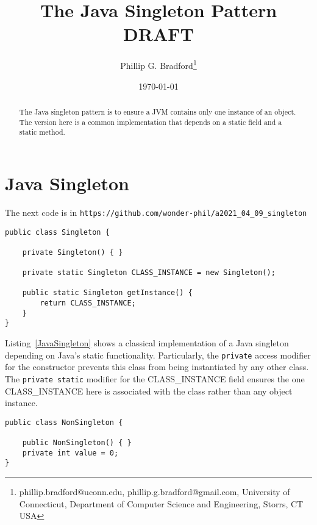 \documentclass[12pt]{article}
\begin{document}
\title{{\bf The Java Singleton Pattern\\DRAFT}}
\author{
Phillip G. Bradford\thanks{phillip.bradford@uconn.edu, phillip.g.bradford@gmail.com,
{\sc University of Connecticut, Department of Computer Science and Engineering, Storrs, CT USA}}
}

\date{\small\today}

\maketitle

%
%
%
\begin{abstract}
The Java singleton pattern is to ensure a JVM contains only one instance of an object.
The version here is a common implementation that depends on a static field and a static method.
\end{abstract}

%
%
%
%
\section{Java Singleton}
\label{Java Singleton}
%
%
%

The next code is in \lstinline|https://github.com/wonder-phil/a2021_04_09_singleton|


\begin{lstlisting}[label=JavaSingleton,frame=lines,caption=Basic Singleton]
public class Singleton {
	
	private Singleton() { }
	
	private static Singleton CLASS_INSTANCE = new Singleton();

	public static Singleton getInstance() {
		return CLASS_INSTANCE;
	}
}
\end{lstlisting}

Listing~\ref{JavaSingleton} shows a classical implementation of a Java singleton depending on Java's static functionality.
Particularly, the \lstinline|private| access modifier for the constructor prevents this class from being instantiated by any other
class.
The \lstinline|private static| modifier for the CLASS\_INSTANCE field ensures the one CLASS\_INSTANCE here is associated with the class
rather than any object instance.

\begin{lstlisting}[label=JavaNONSingleton,frame=lines,caption=Basic Non-Singleton]
public class NonSingleton {
	
	public NonSingleton() { }
	private int value = 0;
}
\end{lstlisting}
\end{document}
